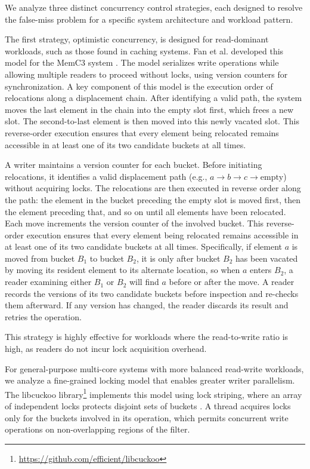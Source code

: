 We analyze three distinct concurrency control strategies, each designed to resolve the false-miss problem for a specific system architecture and workload pattern.

The first strategy, optimistic concurrency, is designed for read-dominant workloads, such as those found in caching systems. Fan et al. developed this model for the MemC3 system \cite{Fan2013MemC3CA}. The model serializes write operations while allowing multiple readers to proceed without locks, using version counters for synchronization. A key component of this model is the execution order of relocations along a displacement chain. After identifying a valid path, the system moves the last element in the chain into the empty slot first, which frees a new slot. The second-to-last element is then moved into this newly vacated slot. This reverse-order execution ensures that every element being relocated remains accessible in at least one of its two candidate buckets at all times.

\begin{definition}
    A writer maintains a version counter for each bucket. Before initiating relocations, it identifies a valid displacement path (e.g., $a \to b \to c \to \text{empty}$) without acquiring locks. The relocations are then executed in reverse order along the path: the element in the bucket preceding the empty slot is moved first, then the element preceding that, and so on until all elements have been relocated. Each move increments the version counter of the involved bucket. This reverse-order execution ensures that every element being relocated remains accessible in at least one of its two candidate buckets at all times. Specifically, if element $a$ is moved from bucket $B_1$ to bucket $B_2$, it is only after bucket $B_2$ has been vacated by moving its resident element to its alternate location, so when $a$ enters $B_2$, a reader examining either $B_1$ or $B_2$ will find $a$ before or after the move. A reader records the versions of its two candidate buckets before inspection and re-checks them afterward. If any version has changed, the reader discards its result and retries the operation.
\end{definition}

This strategy is highly effective for workloads where the read-to-write ratio is high, as readers do not incur lock acquisition overhead.

For general-purpose multi-core systems with more balanced read-write workloads, we analyze a fine-grained locking model that enables greater writer parallelism. The libcuckoo library\footnote{\url{https://github.com/efficient/libcuckoo}} implements this model using lock striping, where an array of independent locks protects disjoint sets of buckets \cite{Li2014AlgorithmicIF, Li2023LockFreeBC}. A thread acquires locks only for the buckets involved in its operation, which permits concurrent write operations on non-overlapping regions of the filter.

